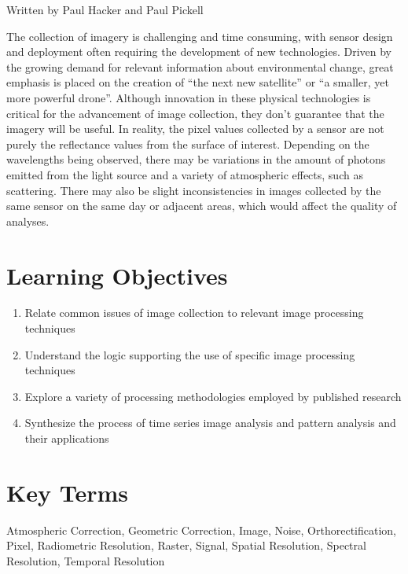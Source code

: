 \documentclass[
]{book}
\providecommand{\tightlist}{%
  \setlength{\itemsep}{0pt}\setlength{\parskip}{0pt}}
\begin{document}
Written by
Paul Hacker and Paul Pickell

The collection of imagery is challenging and time consuming, with sensor design and deployment often requiring the development of new technologies. Driven by the growing demand for relevant information about environmental change, great emphasis is placed on the creation of ``the next new satellite'' or ``a smaller, yet more powerful drone''. Although innovation in these physical technologies is critical for the advancement of image collection, they don't guarantee that the imagery will be useful. In reality, the pixel values collected by a sensor are not purely the reflectance values from the surface of interest. Depending on the wavelengths being observed, there may be variations in the amount of photons emitted from the light source and a variety of atmospheric effects, such as scattering. There may also be slight inconsistencies in images collected by the same sensor on the same day or adjacent areas, which would affect the quality of analyses.

\section*{Learning Objectives}\label{learning-objectives-10}

\begin{enumerate}
\def\labelenumi{\arabic{enumi}.}
\tightlist
\item
  Relate common issues of image collection to relevant image processing techniques
\item
  Understand the logic supporting the use of specific image processing techniques
\item
  Explore a variety of processing methodologies employed by published research
\item
  Synthesize the process of time series image analysis and pattern analysis and their applications
\end{enumerate}

\section*{Key Terms}\label{key-terms-10}

Atmospheric Correction, Geometric Correction, Image, Noise, Orthorectification, Pixel, Radiometric Resolution, Raster, Signal, Spatial Resolution, Spectral Resolution, Temporal Resolution
\end{document}
